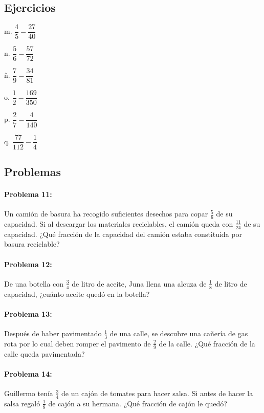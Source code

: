 \documentclass[10pt,twoside]{article}
\begin{document}
\subsection*{Ejercicios}
\begin{enumerate}
\begin{multicols}{3}
\item[m.] $\dfrac{4}{5}-\dfrac{27}{40}$
\item[n.] $\dfrac{5}{6}-\dfrac{57}{72}$
\item[ñ.] $\dfrac{7}{9}-\dfrac{34}{81}$
\item[o.] $\dfrac{1}{2}-\dfrac{169}{350}$
\item[p.] $\dfrac{2}{7}-\dfrac{4}{140}$
\item[q.] $\dfrac{77}{112}-\dfrac{1}{4}$
\end{multicols}
\end{enumerate}
\subsection*{Problemas}
\paragraph*{Problema 11:} Un camión de basura ha recogido suficientes desechos para copar $\frac{5}{6}$ de su capacidad. Si al descargar los materiales reciclables, el camión queda con $\frac{11}{24}$ de su capacidad. ¿Qué fracción de la capacidad del camión estaba constituida por basura reciclable?
\paragraph*{Problema 12:} De una botella con $\frac{3}{4}$ de litro de aceite, Juna llena una alcuza de $\frac{1}{8}$ de litro de capacidad, ¿cuánto aceite quedó en la botella?
\paragraph*{Problema 13:} Después de haber pavimentado $\frac{1}{3}$ de una calle, se descubre una cañería de gas rota por lo cual deben romper el pavimento de $\frac{2}{9}$ de la calle. ¿Qué fracción de la calle queda pavimentada?
\paragraph*{Problema 14:} Guillermo tenía $\frac{3}{4}$ de un cajón de tomates para hacer salsa. Si antes de hacer la salsa regaló $\frac{1}{8}$ de cajón a su hermana. ¿Qué fracción de cajón le quedó?
\end{document}
